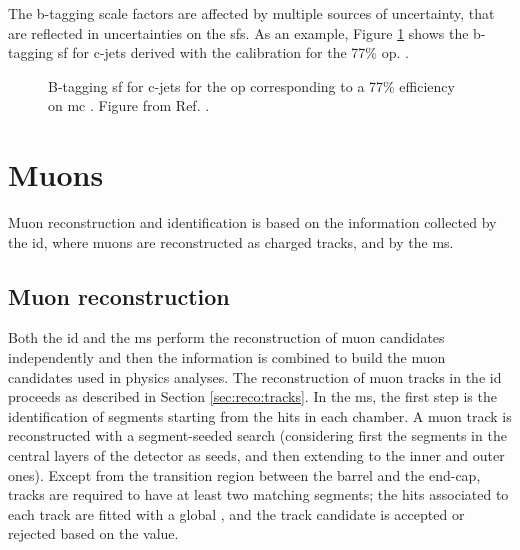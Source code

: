 The b-tagging scale factors are affected by multiple sources of uncertainty, that are reflected in uncertainties on the \glspl{sf}.
As an example, Figure \ref{fig:obj:btagSF} shows the b-tagging \gls{sf} for c-jets derived with the \ttbar calibration for the
77\% \gls{op}. .

\begin{figure}[h]
\begin{center}
\end{center}
 \caption{B-tagging \gls{sf} for c-jets for the \gls{op} corresponding to a 77\% efficiency on \gls{mc} \ttbar. Figure from Ref. \cite{ATLAS:2018bpl}.}
  \label{fig:obj:btagSF}
\end{figure}


\section{Muons}

Muon reconstruction and identification \cite{Aad:2016jkr} is based on the information collected by the \gls{id}, where muons are reconstructed as charged tracks, and by the \gls{ms}. 

\subsection{Muon reconstruction}

Both the \gls{id} and the \gls{ms} perform the reconstruction
of muon candidates independently and then the information is combined to build the muon candidates used in physics analyses. 
The reconstruction of muon tracks in the \gls{id} proceeds as described in Section \ref{sec:reco:tracks}. In the \gls{ms}, the first step is the identification of segments starting from the hits in each chamber. A muon track is reconstructed with a segment-seeded search (considering first the segments in the central layers of the detector as seeds, and then extending to the inner and outer ones). Except from the transition region between the barrel and the end-cap, tracks are required to have at least two matching segments; the hits associated to each track are fitted with a global \chis, and the track candidate is accepted or rejected based on the \chis value. 

